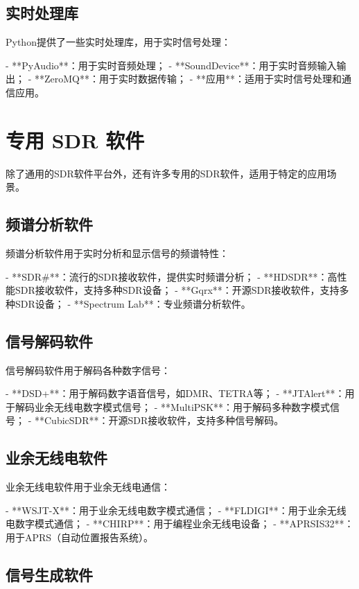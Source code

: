 ﻿\documentclass[UTF8]{ctexbook}
\begin{document}
\subsection{实时处理库}

Python提供了一些实时处理库，用于实时信号处理：

- **PyAudio**：用于实时音频处理；
- **SoundDevice**：用于实时音频输入输出；
- **ZeroMQ**：用于实时数据传输；
- **应用**：适用于实时信号处理和通信应用。

\section{专用 SDR 软件}

除了通用的SDR软件平台外，还有许多专用的SDR软件，适用于特定的应用场景。

\subsection{频谱分析软件}

频谱分析软件用于实时分析和显示信号的频谱特性：

- **SDR\#**：流行的SDR接收软件，提供实时频谱分析；
- **HDSDR**：高性能SDR接收软件，支持多种SDR设备；
- **Gqrx**：开源SDR接收软件，支持多种SDR设备；
- **Spectrum Lab**：专业频谱分析软件。

\subsection{信号解码软件}

信号解码软件用于解码各种数字信号：

- **DSD+**：用于解码数字语音信号，如DMR、TETRA等；
- **JTAlert**：用于解码业余无线电数字模式信号；
- **MultiPSK**：用于解码多种数字模式信号；
- **CubicSDR**：开源SDR接收软件，支持多种信号解码。

\subsection{业余无线电软件}

业余无线电软件用于业余无线电通信：

- **WSJT-X**：用于业余无线电数字模式通信；
- **FLDIGI**：用于业余无线电数字模式通信；
- **CHIRP**：用于编程业余无线电设备；
- **APRSIS32**：用于APRS（自动位置报告系统）。

\subsection{信号生成软件}
\end{document}
